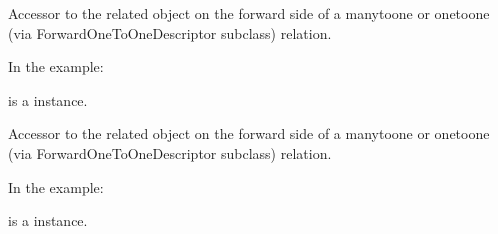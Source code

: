 \documentclass[letterpaper,10pt,english]{sphinxmanual}
\begin{document}
\begin{fulllineitems}
\begin{fulllineitems}
\label{\detokenize{forums:forums.models.Comment2.author}}
Accessor to the related object on the forward side of a many\sphinxhyphen{}to\sphinxhyphen{}one or
one\sphinxhyphen{}to\sphinxhyphen{}one (via ForwardOneToOneDescriptor subclass) relation.

In the example:

\begin{sphinxVerbatim}[commandchars=\\\{\}]
 
       
\end{sphinxVerbatim}

 is a  instance.

\end{fulllineitems}


\begin{fulllineitems}
\label{\detokenize{forums:forums.models.Comment2.comment1}}
Accessor to the related object on the forward side of a many\sphinxhyphen{}to\sphinxhyphen{}one or
one\sphinxhyphen{}to\sphinxhyphen{}one (via ForwardOneToOneDescriptor subclass) relation.

In the example:

\begin{sphinxVerbatim}[commandchars=\\\{\}]
 
       
\end{sphinxVerbatim}

 is a  instance.

\end{fulllineitems}


\end{fulllineitems}
\end{document}
